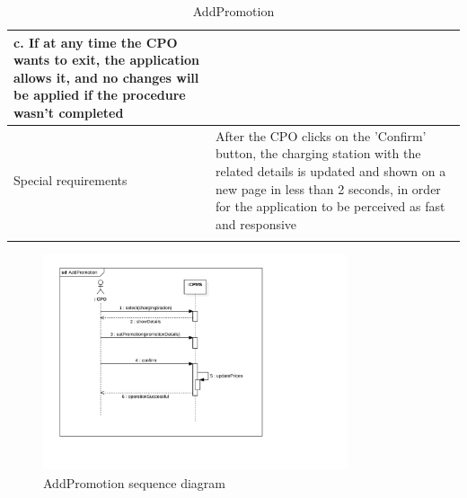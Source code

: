 \begin{center}
\begin{longtable}{p{4cm} p{11cm}}
                    c. If at any time the CPO wants to exit, the application allows it, and no changes will be applied if the procedure wasn't completed \\
     \hline
     Special requirements & After the CPO clicks on the 'Confirm' button, the charging station with the related details is updated and shown on a new page in less than 2 seconds, in order for the application to be perceived as fast and responsive\\
     \hline
    \caption{AddPromotion}
    \label{tab:AddPromotion}
    \end{longtable}
\end{center}

\begin{figure}[H]
    \centering
    \includegraphics[width=0.8\textwidth, trim={0 3cm 6cm 0}, clip]{Images/cp3/seqDiagrams/AddPromotion.pdf}
    \caption{AddPromotion sequence diagram}
\end{figure}

